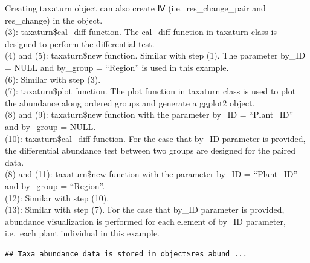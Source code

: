 \documentclass[
]{book}
\newenvironment{Shaded}{\begin{snugshade}}{\end{snugshade}}
\newcommand{\AttributeTok}[1]{\textcolor[rgb]{0.13,0.29,0.53}{#1}}
\newcommand{\CommentTok}[1]{\textcolor[rgb]{0.56,0.35,0.01}{\textit{#1}}}
\newcommand{\ConstantTok}[1]{\textcolor[rgb]{0.56,0.35,0.01}{#1}}
\newcommand{\FloatTok}[1]{\textcolor[rgb]{0.00,0.00,0.81}{#1}}
\newcommand{\FunctionTok}[1]{\textcolor[rgb]{0.13,0.29,0.53}{\textbf{#1}}}
\newcommand{\NormalTok}[1]{#1}
\newcommand{\OtherTok}[1]{\textcolor[rgb]{0.56,0.35,0.01}{#1}}
\newcommand{\SpecialCharTok}[1]{\textcolor[rgb]{0.81,0.36,0.00}{\textbf{#1}}}
\newcommand{\StringTok}[1]{\textcolor[rgb]{0.31,0.60,0.02}{#1}}
\begin{document}
Creating taxaturn object can also create Ⅳ (i.e.~res\_change\_pair and res\_change) in the object.\\
(3): taxaturn\$cal\_diff function. The cal\_diff function in taxaturn class is designed to perform the differential test.\\
(4) and (5): taxaturn\$new function. Similar with step (1). The parameter by\_ID = NULL and by\_group = ``Region'' is used in this example.\\
(6): Similar with step (3).\\
(7): taxaturn\$plot function. The plot function in taxaturn class is used to plot the abundance along ordered groups and generate a ggplot2 object.\\
(8) and (9): taxaturn\$new function with the parameter by\_ID = ``Plant\_ID'' and by\_group = NULL.\\
(10): taxaturn\$cal\_diff function. For the case that by\_ID parameter is provided,
the differential abundance test between two groups are designed for the paired data.\\
(8) and (11): taxaturn\$new function with the parameter by\_ID = ``Plant\_ID'' and by\_group = ``Region''.\\
(12): Similar with step (10).\\
(13): Similar with step (7). For the case that by\_ID parameter is provided, abundance visualization is performed for each element of by\_ID parameter,
i.e.~each plant individual in this example.

\begin{Shaded}
\end{Shaded}

\begin{verbatim}
## Taxa abundance data is stored in object$res_abund ...
\end{verbatim}
\end{document}
